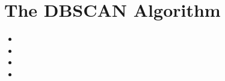 \documentclass[SKLCluster.tex]{subfiles}
\begin{document}
\newpage
\section{The DBSCAN Algorithm}
\begin{itemize}
\item 
\item
\item
\item
\end{itemize}
\end{document}
